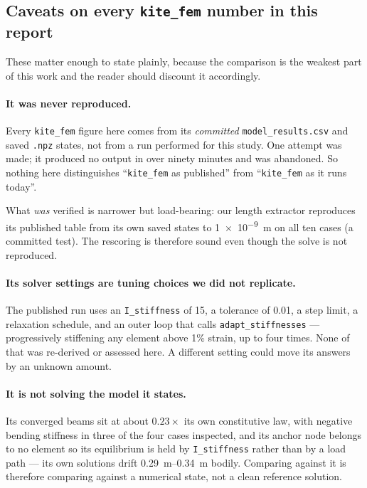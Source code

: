 \documentclass[11pt,a4paper]{article}
\begin{document}
\subsection{Caveats on every \texttt{kite\_fem} number in this report}
\label{sec:caveats}

These matter enough to state plainly, because the comparison is the weakest part
of this work and the reader should discount it accordingly.

\paragraph{It was never reproduced.} Every \texttt{kite\_fem} figure here comes
from its \emph{committed} \texttt{model\_results.csv} and saved \texttt{.npz}
states, not from a run performed for this study. One attempt was made; it
produced no output in over ninety minutes and was abandoned. So nothing here
distinguishes ``\texttt{kite\_fem} as published'' from ``\texttt{kite\_fem} as it
runs today''.

What \emph{was} verified is narrower but load-bearing: our length extractor
reproduces its published table from its own saved states to \SI{1e-9}{m} on all
ten cases (a committed test). The rescoring is therefore sound even though the
solve is not reproduced.

\paragraph{Its solver settings are tuning choices we did not replicate.} The
published run uses an \texttt{I\_stiffness} of 15, a tolerance of \num{0.01}, a
step limit, a relaxation schedule, and an outer loop that calls
\texttt{adapt\_stiffnesses} --- progressively stiffening any element above 1\%
strain, up to four times. None of that was re-derived or assessed here. A
different setting could move its answers by an unknown amount.

\paragraph{It is not solving the model it states.} Its converged beams sit at
about $0.23\times$ its own constitutive law, with negative bending stiffness in
three of the four cases inspected, and its anchor node belongs to no element so
its equilibrium is held by \texttt{I\_stiffness} rather than by a load path ---
its own solutions drift \SIrange{0.29}{0.34}{m} bodily. Comparing against it is
therefore comparing against a numerical state, not a clean reference solution.
\end{document}
